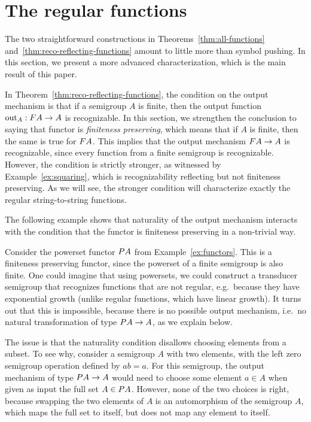 

\section{The regular functions}
\label{sec:reg-char}
The two straightforward constructions in Theorems~\ref{thm:all-functions} and~\ref{thm:reco-reflecting-functions}  amount to little more than symbol pushing. In this section, we present a more advanced  characterization, which is the main result of this paper.

In Theorem~\ref{thm:reco-reflecting-functions}, the condition on the output mechanism is that if a semigroup $A$ is finite, then the output function $\outfun_A : \functor A \to A$ is recognizable. In this section, we strengthen the conclusion to saying that functor is \emph{finiteness preserving}, which means that if $A$ is finite, then the same is true for $\functor A$. This implies that the output mechanism $\functor A \to A$ is recognizable, since every function from a finite semigroup is recognizable. However, the condition is strictly stronger, as witnessed by Example~\ref{ex:squaring}, which is recognizability reflecting but not finiteness preserving. As  we will see, the stronger condition will  characterize exactly the regular string-to-string functions.

The following example shows that naturality of the output mechanism interacts with the condition that 
the functor is finiteness preserving in a non-trivial way.

\begin{example}
    Consider the powerset functor $\powerset A$ from Example~\ref{ex:functors}. This is a finiteness preserving functor, since the powerset of a finite semigroup is also finite. One could imagine that using  powersets, we  could construct a transducer semigroup that recognizes  functions that are not regular, e.g.~because they have exponential growth (unlike regular functions, which have linear growth). It turns out that this is impossible, because there is no possible output mechanism, i.e.~no natural transformation of type $\powerset A \to A$, as we explain below.

    The issue is that the naturality condition disallows choosing elements from a subset.  To see why, consider a semigroup $A$ with two elements, with the left zero semigroup operation defined by $ab=a$. For this semigroup, the output mechanism of type $\powerset A \to A$ would need to choose some element $a \in A$ when given as input  the full set $A \in \powerset A$. However, none of the two choices is right, because swapping the two elements of $A$ is an automorphism of the semigroup $A$, which maps the full set to itself, but does not map any element to itself.
\end{example}

